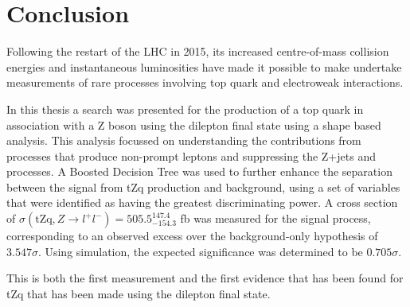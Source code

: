 \chapter{Conclusion}\label{chapter:conclusion}
Following the restart of the LHC in 2015, its increased centre-of-mass collision energies and instantaneous luminosities have made it possible to make undertake measurements of rare processes involving top quark and electroweak interactions.

In this thesis a search was presented for the production of a top quark in association with a Z boson using the dilepton final state using a shape based analysis.
This analysis focussed on understanding the contributions from processes that produce non-prompt leptons and suppressing the Z+jets and \ttbar processes.
A Boosted Decision Tree was used to further enhance the separation between the signal from tZq production and background, using a set of variables that were identified as having the greatest discriminating power.
A cross section of $\sigma (\textrm{tZq}, Z \rightarrow l^{+} l^{-}) = 505.5^{147.4}_{-154.3}$ fb was measured for the signal process, corresponding to an observed excess over the background-only hypothesis of $3.547\sigma$.
Using simulation, the expected significance was determined to be $0.705 \sigma$.

This is both the first measurement and the first evidence that has been found for tZq that has been made using the dilepton final state.



%
%

